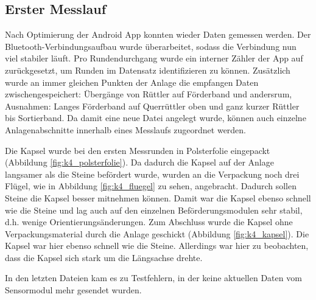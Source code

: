 \subsection{Erster Messlauf}

Nach Optimierung der Android App konnten wieder Daten gemessen werden. Der Bluetooth-Verbindungsaufbau wurde überarbeitet, sodass die Verbindung nun viel stabiler läuft. Pro Rundendurchgang wurde ein interner Zähler der App auf zurückgesetzt, um Runden im Datensatz identifizieren zu können. Zusätzlich wurde an immer gleichen Punkten der Anlage die empfangen Daten zwischengespeichert: Übergänge von Rüttler auf Förderband und andersrum, Ausnahmen: Langes Förderband auf Querrüttler oben und ganz kurzer Rüttler bis Sortierband. Da damit eine neue Datei angelegt wurde, können auch einzelne Anlagenabschnitte innerhalb eines Messlaufs zugeordnet werden.

Die Kapsel wurde bei den ersten Messrunden in Polsterfolie eingepackt (Abbildung \ref{fig:k4_polsterfolie}). Da dadurch die Kapsel auf der Anlage langsamer als die Steine befördert wurde, wurden an die Verpackung noch drei Flügel, wie in Abbildung \ref{fig:k4_fluegel} zu sehen, angebracht. Dadurch sollen Steine die Kapsel besser mitnehmen können. Damit war die Kapsel ebenso schnell wie die Steine und lag auch auf den einzelnen Beförderungsmodulen sehr stabil, d.h. wenige Orientierungsänderungen. Zum Abschluss wurde die Kapsel ohne Verpackungsmaterial durch die Anlage geschickt (Abbildung \ref{fig:k4_kapsel}). Die Kapsel war hier ebenso schnell wie die Steine. Allerdings war hier zu beobachten, dass die Kapsel sich stark um die Längsachse drehte. 

In den letzten Dateien kam es zu Testfehlern, in der keine aktuellen Daten vom Sensormodul mehr gesendet wurden.

